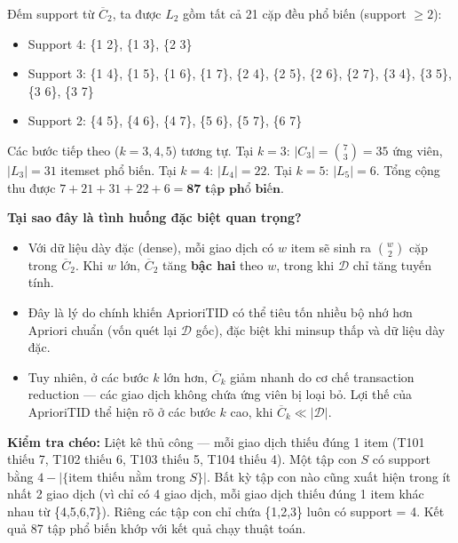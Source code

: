 Đếm support từ $\overline{C}_2$, ta được $L_2$ gồm tất cả 21 cặp đều phổ biến (support $\geq 2$):

\begin{itemize}
    \item Support 4: \{1 2\}, \{1 3\}, \{2 3\}
    \item Support 3: \{1 4\}, \{1 5\}, \{1 6\}, \{1 7\}, \{2 4\}, \{2 5\}, \{2 6\}, \{2 7\}, \{3 4\}, \{3 5\}, \{3 6\}, \{3 7\}
    \item Support 2: \{4 5\}, \{4 6\}, \{4 7\}, \{5 6\}, \{5 7\}, \{6 7\}
\end{itemize}

Các bước tiếp theo ($k=3, 4, 5$) tương tự. Tại $k=3$: $|C_3| = \binom{7}{3} = 35$ ứng viên, $|L_3| = 31$ itemset phổ biến. Tại $k=4$: $|L_4| = 22$. Tại $k=5$: $|L_5| = 6$. Tổng cộng thu được $7 + 21 + 31 + 22 + 6 = \textbf{87 tập phổ biến}$.

\textbf{Tại sao đây là tình huống đặc biệt quan trọng?}

\begin{itemize}
    \item Với dữ liệu dày đặc (dense), mỗi giao dịch có $w$ item sẽ sinh ra $\binom{w}{2}$ cặp trong $\overline{C}_2$. Khi $w$ lớn, $\overline{C}_2$ tăng \textbf{bậc hai} theo $w$, trong khi $\mathcal{D}$ chỉ tăng tuyến tính.
    \item Đây là lý do chính khiến AprioriTID có thể tiêu tốn nhiều bộ nhớ hơn Apriori chuẩn (vốn quét lại $\mathcal{D}$ gốc), đặc biệt khi minsup thấp và dữ liệu dày đặc.
    \item Tuy nhiên, ở các bước $k$ lớn hơn, $\overline{C}_k$ giảm nhanh do cơ chế transaction reduction --- các giao dịch không chứa ứng viên bị loại bỏ. Lợi thế của AprioriTID thể hiện rõ ở các bước $k$ cao, khi $\overline{C}_k \ll |\mathcal{D}|$.
\end{itemize}

\textbf{Kiểm tra chéo:} Liệt kê thủ công --- mỗi giao dịch thiếu đúng 1 item (T101 thiếu 7, T102 thiếu 6, T103 thiếu 5, T104 thiếu 4). Một tập con $S$ có support bằng $4 - |\{$item thiếu nằm trong $S\}|$. Bất kỳ tập con nào cũng xuất hiện trong ít nhất 2 giao dịch (vì chỉ có 4 giao dịch, mỗi giao dịch thiếu đúng 1 item khác nhau từ \{4,5,6,7\}). Riêng các tập con chỉ chứa \{1,2,3\} luôn có support = 4. Kết quả 87 tập phổ biến khớp với kết quả chạy thuật toán.